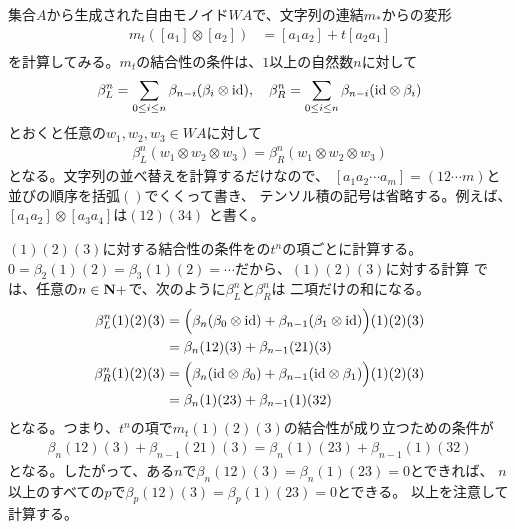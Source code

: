 		集合$A$から生成された自由モノイド$WA$で、文字列の連結$m_*$からの変形
		\begin{equation}\label{eq:積の変形その一}\begin{split} %
			m_t([a_1]\otimes[a_2]) &= [a_1a_2] + t[a_2a_1] \\
		\end{split}\end{equation} %
		を計算してみる。$m_t$の結合性の条件は、$1$以上の自然数$n$に対して
		\begin{equation*}\begin{split} %
			\beta_L^n = \sum_{0\le i\le n}\beta_{n-i}(\beta_i\otimes \myid)
			,\quad
			\beta_R^n = \sum_{0\le i\le n}\beta_{n-i}(\myid\otimes \beta_i)
		\end{split}\end{equation*} %
		とおくと任意の$w_1,w_2,w_3\in WA$に対して
		\begin{equation*}\begin{split} %
			\beta_L^n(w_1\otimes w_2\otimes w_3)
			=\beta_R^n(w_1\otimes w_2\otimes w_3)
		\end{split}\end{equation*} %
		となる。文字列の並べ替えを計算するだけなので、
		$[a_1a_2\cdots a_m]=(12\cdots m)$と並びの順序を括弧$()$でくくって書き、
		テンソル積の記号は省略する。例えば、$[a_1a_2]\otimes[a_3a_4]$は$(12)(34)$
		と書く。
		
		$(1)(2)(3)$に対する結合性の条件をの$t^n$の項ごとに計算する。
		$0=\beta_2(1)(2)=\beta_3(1)(2)=\cdots$だから、$(1)(2)(3)$に対する計算
		では、任意の$n\in{\mathbf{N}}+$で、次のように$\beta_L^n$と$\beta_R^n$は
		二項だけの和になる。
		\begin{equation*}\begin{split} %
			\beta_L^n(1)(2)(3) &= \Bigl(\beta_n(\beta_0\otimes \myid)
			+\beta_{n-1}(\beta_1\otimes \myid)\Bigr)(1)(2)(3) \\
			&= \beta_n(12)(3) + \beta_{n-1}(21)(3) \\
			\beta_R^n(1)(2)(3) &= \Bigl(\beta_n(\myid\otimes \beta_0)
			+\beta_{n-1}(\myid\otimes \beta_1)\Bigr)(1)(2)(3) \\
			&= \beta_n(1)(23) + \beta_{n-1}(1)(32) \\
		\end{split}\end{equation*} %
		となる。つまり、$t^n$の項で$m_t(1)(2)(3)$の結合性が成り立つための条件が
		\begin{equation*}\begin{split} %
			\beta_n(12)(3) + \beta_{n-1}(21)(3)
			=\beta_n(1)(23) + \beta_{n-1}(1)(32)
		\end{split}\end{equation*} %
		となる。したがって、ある$n$で$\beta_n(12)(3)=\beta_n(1)(23)=0$とできれば、
		$n$以上のすべての$p$で$\beta_p(12)(3)=\beta_p(1)(23)=0$とできる。
		以上を注意して計算する。

